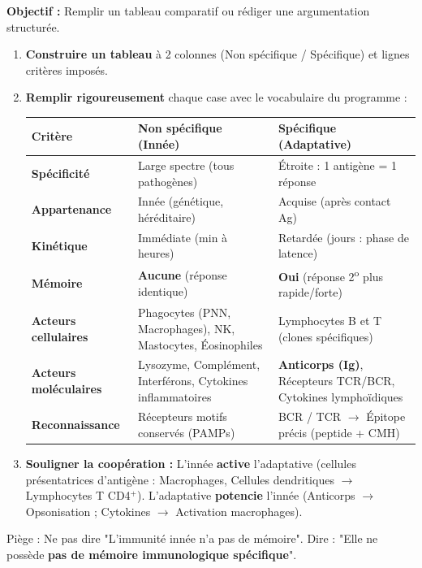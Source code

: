 \documentclass[11pt]{article}
\newcommand{\cle}[1]{{\popxbold\color{popdark}#1}}
\begin{document}
\begin{methode}
\textbf{Objectif :} Remplir un tableau comparatif ou rédiger une argumentation structurée.
\begin{enumerate}
 \item \textbf{Construire un tableau} à 2 colonnes (Non spécifique / Spécifique) et lignes critères imposés.
 \item \textbf{Remplir rigoureusement} chaque case avec le vocabulaire du programme :
 \begin{center}
 \begin{tabular}{|l|>{\raggedright\arraybackslash}p{5cm}|>{\raggedright\arraybackslash}p{5cm}|}\hline
 \textbf{Critère} & \textbf{Non spécifique (Innée)} & \textbf{Spécifique (Adaptative)} \\ \hline
 \textbf{Spécificité} & Large spectre (tous pathogènes) & Étroite : 1 antigène = 1 réponse \\ \hline
 \textbf{Appartenance} & Innée (génétique, héréditaire) & Acquise (après contact Ag) \\ \hline
 \textbf{Kinétique} & Immédiate (min à heures) & Retardée (jours : phase de latence) \\ \hline
 \textbf{Mémoire} & \textbf{Aucune} (réponse identique) & \textbf{Oui} (réponse 2\textsuperscript{o} plus rapide/forte) \\ \hline
 \textbf{Acteurs cellulaires} & Phagocytes (PNN, Macrophages), NK, Mastocytes, Éosinophiles & Lymphocytes B et T (clones spécifiques) \\ \hline
 \textbf{Acteurs moléculaires} & Lysozyme, Complément, Interférons, Cytokines inflammatoires & \textbf{Anticorps (Ig)}, Récepteurs TCR/BCR, Cytokines lymphoïdiques \\ \hline
 \textbf{Reconnaissance} & Récepteurs motifs conservés (PAMPs) & BCR / TCR $\rightarrow$ Épitope précis (peptide + CMH) \\ \hline
 \end{tabular}
 \end{center}
 \item \textbf{Souligner la coopération :} L'innée \textbf{active} l'adaptative (cellules présentatrices d'antigène : Macrophages, Cellules dendritiques $\rightarrow$ Lymphocytes T CD4$^+$). L'adaptative \textbf{potencie} l'innée (Anticorps $\rightarrow$ Opsonisation ; Cytokines $\rightarrow$ Activation macrophages).
\end{enumerate}
\cle{Piège :} Ne pas dire "L'immunité innée n'a pas de mémoire". Dire : "Elle ne possède \textbf{pas de mémoire immunologique spécifique}".
\end{methode}
\end{document}
